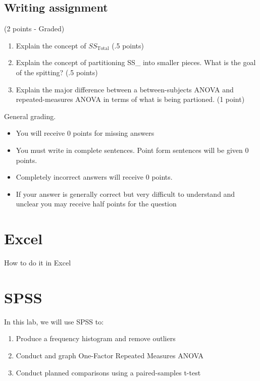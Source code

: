 \documentclass[
]{book}
\providecommand{\tightlist}{%
  \setlength{\itemsep}{0pt}\setlength{\parskip}{0pt}}
\begin{document}
\hypertarget{writing-assignment-8}{%
\subsection{Writing assignment}\label{writing-assignment-8}}

(2 points - Graded)

\begin{enumerate}
\def\labelenumi{\arabic{enumi}.}
\item
  Explain the concept of \(SS_\text{Total}\) (.5 points)
\item
  Explain the concept of partitioning SS\_ into smaller pieces. What is the goal of the spitting? (.5 points)
\item
  Explain the major difference between a between-subjects ANOVA and repeated-measures ANOVA in terms of what is being partioned. (1 point)
\end{enumerate}

General grading.

\begin{itemize}
\tightlist
\item
  You will receive 0 points for missing answers
\item
  You must write in complete sentences. Point form sentences will be given 0 points.
\item
  Completely incorrect answers will receive 0 points.
\item
  If your answer is generally correct but very difficult to understand and unclear you may receive half points for the question
\end{itemize}

\hypertarget{excel-9}{%
\section{Excel}\label{excel-9}}

How to do it in Excel

\hypertarget{spss-9}{%
\section{SPSS}\label{spss-9}}

In this lab, we will use SPSS to:

\begin{enumerate}
\def\labelenumi{\arabic{enumi}.}
\tightlist
\item
  Produce a frequency histogram and remove outliers
\item
  Conduct and graph One-Factor Repeated Measures ANOVA
\item
  Conduct planned comparisons using a paired-samples t-test
\end{enumerate}
\end{document}
